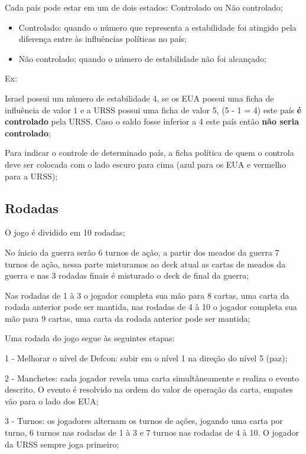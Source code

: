 \documentclass[11pt]{article}
\begin{document}
Cada país pode estar em um de dois estados: Controlado ou Não controlado;

\begin{itemize}
\item Controlado: quando o número que representa a estabilidade foi atingido pela diferença entre às influências políticas no país;

\item Não controlado; quando o número de estabilidade não foi alcançado;
\end{itemize}

Ex:

Israel possui um número de estabilidade 4, se os EUA possui uma ficha de influência de valor 1 e a URSS possui uma ficha de valor 5, (5 - 1 = 4) este país \textbf{é controlado} pela URSS. Caso o saldo fosse inferior a 4 este país então
\textbf{não seria controlado};

Para indicar o controle de determinado país, a ficha política de quem o controla deve ser colocada com o lado escuro para cima (azul para os EUA e vermelho para a URSS);

\subsection{Rodadas}
\label{sec:org7cb7c30}

O jogo é dividido em 10 rodadas;

No ínicio da guerra serão 6 turnos de ação, a partir dos meados da guerra 7 turnos de ação, nessa parte misturamos ao deck atual as cartas de meados da guerra e nas 3 rodadas finais é misturado o deck de final da guerra;

Nas rodadas de 1 à 3 o jogador completa sua mão para 8 cartas, uma carta da rodada anterior pode ser mantida, nas rodadas de 4 à 10 o jogador completa sua mão para 9 cartas, uma carta da rodada anterior pode ser mantida;

Uma rodada do jogo segue às seguintes etapas:

1 - Melhorar o nível de Defcon: subir em o nível 1 na direção do nível 5 (paz);

2 - Manchetes: cada jogador revela uma carta simultâneamente e realiza o evento descrito. O evento é resolvido na ordem do valor de operação da carta, empates vão para o lado dos EUA;

3 - Turnos: os jogadores alternam os turnos de ações, jogando uma carta por turno, 6 turnos nas rodadas de 1 à 3 e 7 turnos nas rodadas de 4 à 10. O jogador da URSS sempre joga primeiro;
\end{document}
